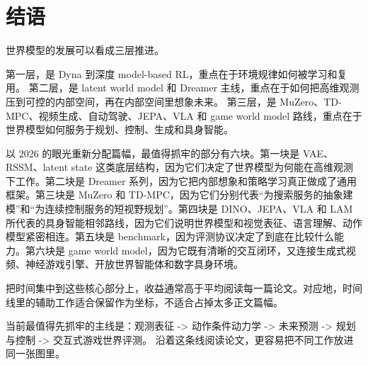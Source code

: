 \documentclass[11pt,a4paper]{ctexart}
\begin{document}
\section*{结语}

世界模型的发展可以看成三层推进。

第一层，是 Dyna 到深度 model-based RL，重点在于环境规律如何被学习和复用。
第二层，是 latent world model 和 Dreamer 主线，重点在于如何把高维观测压到可控的内部空间，再在内部空间里想象未来。
第三层，是 MuZero、TD-MPC、视频生成、自动驾驶、JEPA、VLA 和 game world model 路线，重点在于世界模型如何服务于规划、控制、生成和具身智能。

以 2026 的眼光重新分配篇幅，最值得抓牢的部分有六块。第一块是 VAE、RSSM、latent state 这类底层结构，因为它们决定了世界模型为何能在高维观测下工作。第二块是 Dreamer 系列，因为它把内部想象和策略学习真正做成了通用框架。第三块是 MuZero 和 TD-MPC，因为它们分别代表“为搜索服务的抽象建模”和“为连续控制服务的短视野规划”。第四块是 DINO、JEPA、VLA 和 LAM 所代表的具身智能相邻路线，因为它们说明世界模型和视觉表征、语言理解、动作模型紧密相连。第五块是 benchmark，因为评测协议决定了到底在比较什么能力。第六块是 game world model，因为它既有清晰的交互闭环，又连接生成式视频、神经游戏引擎、开放世界智能体和数字具身环境。

把时间集中到这些核心部分上，收益通常高于平均阅读每一篇论文。对应地，时间线里的辅助工作适合保留作为坐标，不适合占掉太多正文篇幅。

当前最值得先抓牢的主线是：观测表征 -> 动作条件动力学 -> 未来预测 -> 规划与控制 -> 交互式游戏世界评测。
沿着这条线阅读论文，更容易把不同工作放进同一张图里。
\end{document}

